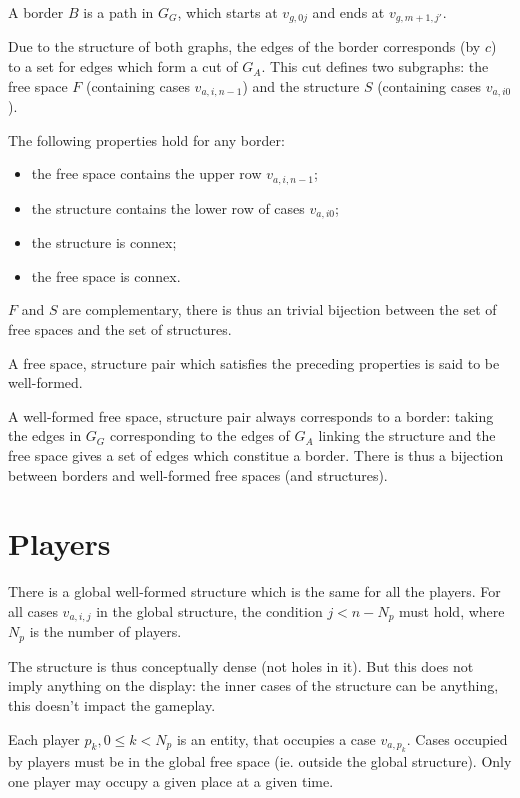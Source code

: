 A border $B$ is a path in $G_G$, which starts at $v_{g,0j}$ and ends at
$v_{g,m+1,j'}$.

Due to the structure of both graphs, the edges of the border corresponds
(by $c$) to a set for edges which form a cut of $G_A$. This cut defines
two subgraphs: the free space $F$ (containing cases $v_{a,i,n-1}$) and
the structure $S$ (containing cases $v_{a,i0}$).

The following properties hold for any border:
\begin{itemize}
    \item the free space contains the upper row $v_{a,i,n-1}$;
    \item the structure contains the lower row of cases $v_{a,i0}$;
    \item the structure is connex;
    \item the free space is connex.
\end{itemize}

$F$ and $S$ are complementary, there is thus an trivial bijection between
the set of free spaces and the set of structures.

A free space, structure pair  which satisfies the preceding properties
is said to be well-formed.

A well-formed free space, structure pair always corresponds to a border:
taking the edges in $G_G$ corresponding to the edges of $G_A$
linking the structure and the free space gives
a set of edges which constitue a border.
There is thus a bijection between borders and well-formed free spaces (and structures).

\section{Players}

There is a global well-formed structure which is the same for all the players.
For all cases $v_{a,i,j}$ in the global structure, the condition $j < n - N_p$
must hold, where $N_p$ is the number of players.

The structure is thus conceptually dense (not holes in it). But this
does not imply anything on the display: the inner cases of the structure
can be anything, this doesn't impact the gameplay.

Each player $p_k, 0\le k < N_p$ is an entity, that occupies a case $v_{a,p_k}$.
Cases occupied by players must be in the global free space (ie. outside the global
structure). Only one player may occupy a given place at a given time.


